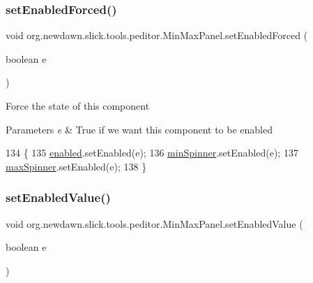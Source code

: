 \subsubsection{\texorpdfstring{set\+Enabled\+Forced()}{setEnabledForced()}}
{\footnotesize\ttfamily void org.\+newdawn.\+slick.\+tools.\+peditor.\+Min\+Max\+Panel.\+set\+Enabled\+Forced (\begin{DoxyParamCaption}\item[{boolean}]{e }\end{DoxyParamCaption})\hspace{0.3cm}{\ttfamily [inline]}}

Force the state of this component


\begin{DoxyParams}{Parameters}
{\em e} & True if we want this component to be enabled \\
\hline
\end{DoxyParams}

\begin{DoxyCode}
134     \{
135         \mbox{\hyperlink{classorg_1_1newdawn_1_1slick_1_1tools_1_1peditor_1_1_min_max_panel_aff685339c4d9c4cf8009bcfbf2bc72de}{enabled}}.setEnabled(e);
136         \mbox{\hyperlink{classorg_1_1newdawn_1_1slick_1_1tools_1_1peditor_1_1_min_max_panel_ae09b9ecc2a254d7a74044bb20b6b62e6}{minSpinner}}.setEnabled(e);
137         \mbox{\hyperlink{classorg_1_1newdawn_1_1slick_1_1tools_1_1peditor_1_1_min_max_panel_a9e445c1f2ecd3c64e93ec8bf69f639f9}{maxSpinner}}.setEnabled(e);
138     \}
\end{DoxyCode}
\mbox{\label{classorg_1_1newdawn_1_1slick_1_1tools_1_1peditor_1_1_min_max_panel_a554148dcd8bb5b5bf6a91194f65f679b}} 
\subsubsection{\texorpdfstring{set\+Enabled\+Value()}{setEnabledValue()}}
{\footnotesize\ttfamily void org.\+newdawn.\+slick.\+tools.\+peditor.\+Min\+Max\+Panel.\+set\+Enabled\+Value (\begin{DoxyParamCaption}\item[{boolean}]{e }\end{DoxyParamCaption})\hspace{0.3cm}{\ttfamily [inline]}}


